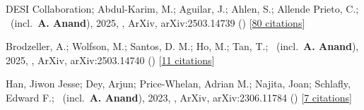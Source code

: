 \item[{\color{numcolor}\scriptsize3}] DESI Collaboration; Abdul-Karim, M.; Aguilar, J.; Ahlen, S.; Allende Prieto, C.; \etal\ (incl.\ \textbf{A. Anand}), 2025, , ArXiv, arXiv:2503.14739 () [\href{https://ui.adsabs.harvard.edu/abs/2025arXiv250314739D}{80 citations}]

\item[{\color{numcolor}\scriptsize2}] Brodzeller, A.; Wolfson, M.; Santos, D. M.; Ho, M.; Tan, T.; \etal\ (incl.\ \textbf{A. Anand}), 2025, , ArXiv, arXiv:2503.14740 () [\href{https://ui.adsabs.harvard.edu/abs/2025arXiv250314740B}{11 citations}]

\item[{\color{numcolor}\scriptsize1}] Han, Jiwon Jesse; Dey, Arjun; Price-Whelan, Adrian M.; Najita, Joan; Schlafly, Edward F.; \etal\ (incl.\ \textbf{A. Anand}), 2023, , ArXiv, arXiv:2306.11784 () [\href{https://ui.adsabs.harvard.edu/abs/2023arXiv230611784H}{7 citations}]